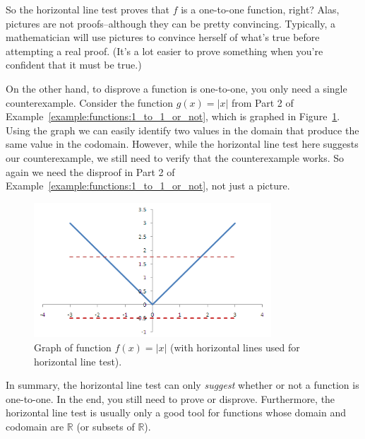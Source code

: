 \begin{rem}
So the horizontal line test proves that $f$ is a one-to-one function, right? Alas,  pictures are not proofs--although they can be pretty convincing. 
Typically, a mathematician will use pictures to convince herself of what's true before attempting a real proof. (It's a lot easier to prove something when you're confident that it must be true.)

On the other hand, to disprove a function is one-to-one, you only need a single counterexample.  Consider the function $g(x)= |x|$ from Part 2 of Example~\ref{example:functions:1_to_1_or_not}, which is graphed in Figure~\ref{fig:absx}.
Using the graph we can easily identify two values in the domain that produce the same value in the codomain.  However, while the horizontal line test here suggests our counterexample, we still need to verify that the counterexample works.  So again we need the disproof in Part 2 of Example~\ref{example:functions:1_to_1_or_not}, not just a picture.

\begin{figure}[h]
\includegraphics[width=3.5in]{images/absx.png}
\caption{Graph of function $f(x)=|x|$  (with horizontal lines used for horizontal line test).}
\label{fig:absx}
\end{figure}

In summary, the horizontal line test can only \emph{suggest} whether or not a function is one-to-one. In the end, you still need to prove or disprove.  Furthermore, the horizontal line test is usually only a good tool for functions whose domain and codomain are ${\mathbb R}$ (or subsets of ${\mathbb R}$).
\end{rem}  

